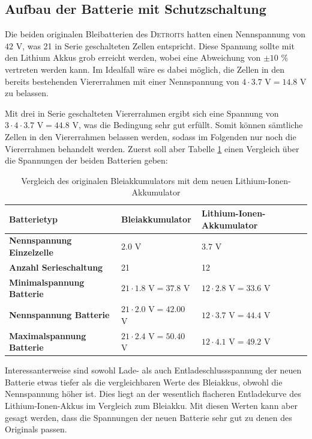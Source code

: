 \subsection{Aufbau der Batterie mit Schutzschaltung}
Die beiden originalen Bleibatterien des \textsc{Detroits} hatten einen Nennspannung von $42$ V, was 21 in Serie geschalteten Zellen entspricht. Diese Spannung sollte mit den Lithium Akkus grob erreicht werden, wobei eine Abweichung von $\pm 10$ \% vertreten werden kann. Im Idealfall wäre es dabei möglich, die Zellen in den bereits bestehenden Viererrahmen mit einer Nennspannung von $4\cdot 3.7$ V$=14.8$ V zu belassen.

Mit drei in Serie geschalteten Viererrahmen ergibt sich eine Spannung von $3\cdot 4\cdot 3.7$ V$=44.8$ V, was die Bedingung sehr gut erfüllt. Somit können sämtliche Zellen in den Viererrahmen belassen werden, sodass im Folgenden nur noch die Viererrahmen behandelt werden. Zuerst soll aber Tabelle \ref{tab:bat_vergl} einen Vergleich über die Spannungen der beiden Batterien geben:

\begin{table}[h]
\centering
\begin{tabular}{|l|l|l|}
\hline
\textbf{Batterietyp}              & \textbf{Bleiakkumulator} & \textbf{Lithium-Ionen-Akkumulator} \\ \hline
\textbf{Nennspannung Einzelzelle} & $2.0$ V                            & $3.7$ V                                    \\ \hline
\textbf{Anzahl Serieschaltung}    & 21                                  & 12                                          \\ \hline
\textbf{Minimalspannung Batterie} & $21\cdot1.8$ V$=37.8$ V           & $12\cdot2.8$ V$=33.6$ V                     \\ \hline
\textbf{Nennspannung Batterie}    & $21\cdot2.0$ V$=42.00$ V           & $12\cdot3.7$ V$=44.4$ V                    \\ \hline
\textbf{Maximalspannung Batterie} & $21\cdot2.4$ V$=50.40$ V            & $12\cdot4.1$ V$=49.2$ V                     \\ \hline
\end{tabular}
\caption{Vergleich des originalen Bleiakkumulators mit dem neuen Lithium-Ionen-Akkumulator}
\label{tab:bat_vergl}
\end{table}

Interessanterweise sind sowohl Lade- als auch Entladeschlussspannung der neuen Batterie etwas tiefer als die vergleichbaren Werte des Bleiakkus, obwohl die Nennspannung höher ist. Dies liegt an der wesentlich flacheren Entladekurve des Lithium-Ionen-Akkus im Vergleich zum Bleiakku. Mit diesen Werten kann aber gesagt werden, dass die Spannungen der neuen Batterie sehr gut zu denen des Originals passen.

